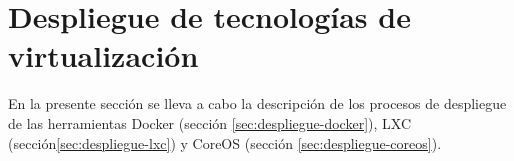\section{\label{sec:intro-despliegue}Despliegue de tecnologías de virtualización}

En la presente sección se lleva a cabo la descripción de los procesos de despliegue de las herramientas Docker (sección \ref{sec:despliegue-docker}), LXC (sección\ref{sec:despliegue-lxc}) y CoreOS (sección \ref{sec:despliegue-coreos}). 
